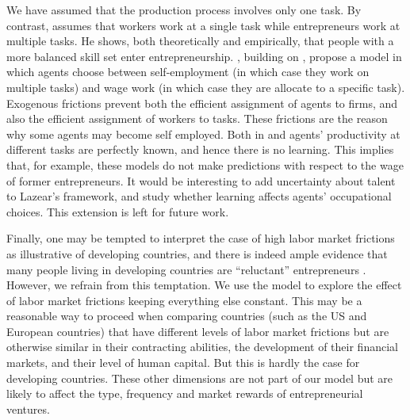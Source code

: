 \documentclass[12pt,american]{paper}
\theoremstyle{remark}
\begin{document}
We have assumed that the production process involves only one task. By contrast, \citet{lazear2004balanced} assumes that workers work at a single task while entrepreneurs work at multiple tasks. He shows, both theoretically and empirically, that people with a more balanced skill set enter entrepreneurship. \citet*{aastebro2011stars}, building on \citet{lazear2004balanced}, propose a model in which agents choose between self-employment (in which case they work on multiple tasks) and wage work (in which case they are allocate to a specific task). Exogenous frictions prevent both the efficient assignment of agents to firms, and also the efficient assignment of workers to tasks. These frictions are the reason why some agents may become self employed. Both in \citet{lazear2004balanced}  and \citet{aastebro2011stars} agents' productivity at different tasks are perfectly known, and hence there is no learning. This implies that, for example, these models do not  make predictions with respect to the wage of former entrepreneurs.
It would be interesting to add uncertainty about talent to Lazear's framework, and study whether learning affects agents' occupational choices. This extension is left for future work. 

Finally, one may be tempted to interpret the case of high labor market frictions as illustrative of developing countries, and there is indeed ample evidence that many people living in developing countries are ``reluctant'' entrepreneurs  \citep{pooreconomics}. However, we refrain from this temptation. We use the model to explore the effect of labor market frictions keeping everything else constant. This may be a reasonable way to proceed when comparing countries (such as the US and European countries) that have different levels of labor market frictions but are otherwise similar in their contracting abilities, the development of their financial markets, and their level of human capital. But this is hardly the case for developing countries.  These other dimensions are not part of our model but are likely to affect the type, frequency and market rewards of entrepreneurial ventures.
\end{document}

